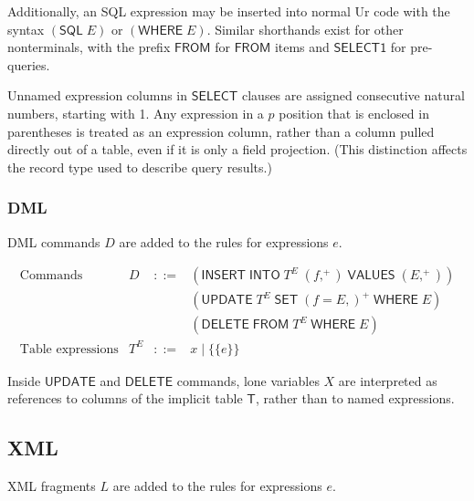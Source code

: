 \documentclass{article}
\newcommand{\mt}[1]{\mathsf{#1}}
\begin{document}
Additionally, an SQL expression may be inserted into normal Ur code with the syntax $(\mt{SQL} \; E)$ or $(\mt{WHERE} \; E)$.  Similar shorthands exist for other nonterminals, with the prefix $\mt{FROM}$ for $\mt{FROM}$ items and $\mt{SELECT1}$ for pre-queries.

Unnamed expression columns in $\mt{SELECT}$ clauses are assigned consecutive natural numbers, starting with 1.  Any expression in a $p$ position that is enclosed in parentheses is treated as an expression column, rather than a column pulled directly out of a table, even if it is only a field projection.  (This distinction affects the record type used to describe query results.)

\subsubsection{DML}

DML commands $D$ are added to the rules for expressions $e$.

$$\begin{array}{rrcll}
  \textrm{Commands} & D &::=& (\mt{INSERT} \; \mt{INTO} \; T^E \; (f,^+) \; \mt{VALUES} \; (E,^+)) \\
  &&& (\mt{UPDATE} \; T^E \; \mt{SET} \; (f = E,)^+ \; \mt{WHERE} \; E) \\
  &&& (\mt{DELETE} \; \mt{FROM} \; T^E \; \mt{WHERE} \; E) \\
  \textrm{Table expressions} & T^E &::=& x \mid \{\{e\}\}
\end{array}$$

Inside $\mt{UPDATE}$ and $\mt{DELETE}$ commands, lone variables $X$ are interpreted as references to columns of the implicit table $\mt{T}$, rather than to named expressions.

\subsection{XML}

XML fragments $L$ are added to the rules for expressions $e$.
\end{document}
